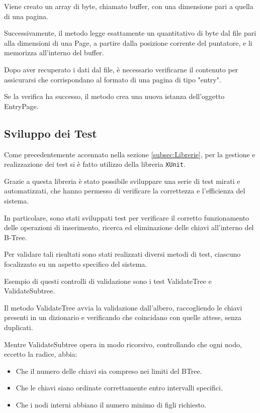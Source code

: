\documentclass[12pt,a4paper,openright,twoside]{book}
\begin{document}
                    Viene creato un array di byte, chiamato buffer, con una dimensione pari a quella di una pagina.

                    Successivamente, il metodo legge esattamente un quantitativo di byte dal file pari alla dimensioni di una Page, a partire dalla posizione corrente del puntatore, e li memorizza all'interno del buffer.

                    Dopo aver recuperato i dati dal file, è necessario verificarne il contenuto per assicurarsi che corrispondano al formato di una pagina di tipo "entry".

                    Se la verifica ha successo, il metodo crea una nuova istanza dell'oggetto EntryPage.

        \subsection{Sviluppo dei Test}

            Come precedentemente accennato nella sezione \cref{subsec:Librerie}, per la gestione e realizzazione dei test si è fatto utilizzo della libreria \texttt{XUnit}.

            Grazie a questa libreria è stato possibile sviluppare una serie di test mirati e automatizzati, che hanno permesso di verificare la correttezza e l'efficienza del sistema.

            In particolare, sono stati sviluppati test per verificare il corretto funzionamento delle operazioni di inserimento, ricerca ed eliminazione delle chiavi all'interno del B-Tree.

            Per validare tali risultati sono stati realizzati diversi metodi di test, ciascuno focalizzato su un aspetto specifico del sistema.

            Esempio di questi controlli di validazione sono i test ValidateTree e ValidateSubtree.

            

            Il metodo ValidateTree avvia la validazione dall'albero, raccogliendo le chiavi presenti in un dizionario e verificando che coincidano con quelle attese, senza duplicati.

            Mentre ValidateSubtree opera in modo ricorsivo, controllando che ogni nodo, eccetto la radice, abbia:

            \begin{itemize}
                \item Che il numero delle chiavi sia compreso nei limiti del BTree.
                \item Che le chiavi siano ordinate correttamente entro intervalli specifici.
                \item Che i nodi interni abbiano il numero minimo di figli richiesto.
            \end{itemize}
\end{document}
